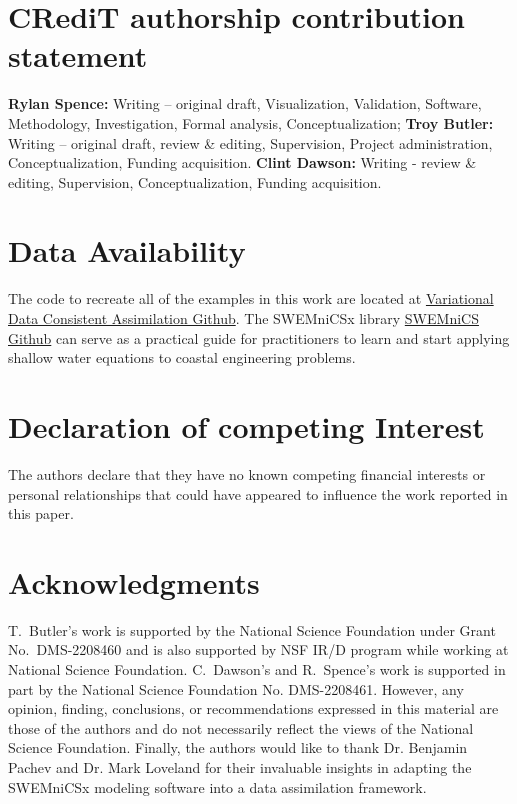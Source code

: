 \documentclass[final,1p,times]{elsarticle}
\begin{document}
\section{CRediT authorship contribution statement}
\textbf{Rylan Spence:} Writing – original draft, Visualization, Validation, Software, Methodology, Investigation, Formal analysis, Conceptualization;
\textbf{Troy Butler:} Writing – original draft, review \& editing, Supervision, Project administration, Conceptualization, Funding acquisition. 
\textbf{Clint Dawson: }  Writing - review \& editing, Supervision, Conceptualization, Funding acquisition.
\section{Data Availability}
The code to recreate all of the examples in this work are located at \href{https://github.com/rspence821505/Variational-Data-Consistent-Assimilation}{Variational Data Consistent Assimilation Github}. The SWEMniCSx library \href{https://github.com/UT-CHG/SWEMniCS}{SWEMniCS Github} can serve as a practical guide for practitioners to learn and start applying shallow water equations to coastal engineering problems. 

\section{Declaration of competing Interest}
The authors declare that they have no known competing financial interests or personal relationships that could have appeared to
influence the work reported in this paper.
\section{Acknowledgments}

T.~Butler's work is supported by the National Science Foundation under Grant No.~DMS-2208460 and is also supported by NSF IR/D program while working at National Science Foundation. 
C.~Dawson’s and R.~Spence's work is supported in part by the National Science Foundation No. DMS-2208461. 
However, any opinion, finding, conclusions, or recommendations expressed in this material are those of the authors and do not necessarily reflect the views of the National Science Foundation. Finally, the authors would like to thank Dr. Benjamin Pachev and Dr. Mark Loveland for their invaluable insights in adapting the SWEMniCSx modeling software into a data assimilation framework.
\end{document}
